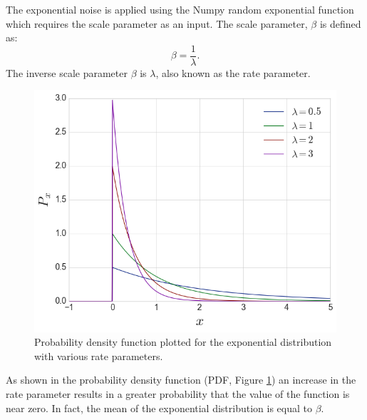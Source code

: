 \documentclass[conference]{IEEEtran}
\begin{document}
The exponential noise is applied using the Numpy random exponential function\cite{noauthor_numpyrandomexponential_nodate} which requires the scale parameter as an input.
The scale parameter, $\beta$ is defined as:
\begin{equation}\label{eq:exp_scale}
	\beta = \frac{1}{\lambda}.
\end{equation}
The inverse scale parameter $\beta$ is $\lambda$, also known as the rate parameter.

\begin{figure}
	\centering
	\includegraphics[width=1\linewidth]{images/exp_pdf}
	\caption{Probability density function plotted for the exponential distribution with various rate parameters.}
	\label{fig:exp_pdf}
\end{figure}

As shown in the probability density function (PDF, Figure \ref{fig:exp_pdf}) an increase in the rate parameter results in a greater probability that the value of the function is near zero. 
In fact, the mean of the exponential distribution is equal to $\beta$. 
\end{document}
